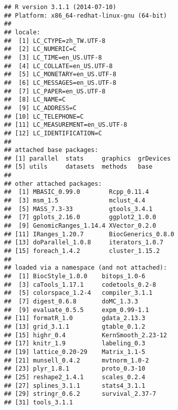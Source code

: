 \documentclass[a4paper,10pt]{article}\usepackage[]{graphicx}\usepackage[]{color}
\makeatletter
\newenvironment{kframe}{%
 \def\at@end@of@kframe{}%
 \ifinner\ifhmode%
  \def\at@end@of@kframe{\end{minipage}}%
  \begin{minipage}{\columnwidth}%
 \fi\fi%
 \def\FrameCommand##1{\hskip\@totalleftmargin \hskip-\fboxsep
 \colorbox{shadecolor}{##1}\hskip-\fboxsep
     \hskip-\linewidth \hskip-\@totalleftmargin \hskip\columnwidth}%
 \MakeFramed {\advance\hsize-\width
   \@totalleftmargin\z@ \linewidth\hsize
   \@setminipage}}%
 {\par\unskip\endMakeFramed%
 \at@end@of@kframe}
\newenvironment{knitrout}{}{} %
\makeatother
\begin{document}
\begin{knitrout}
\color{fgcolor}\begin{kframe}
\begin{verbatim}
## R version 3.1.1 (2014-07-10)
## Platform: x86_64-redhat-linux-gnu (64-bit)
## 
## locale:
##  [1] LC_CTYPE=zh_TW.UTF-8      
##  [2] LC_NUMERIC=C              
##  [3] LC_TIME=en_US.UTF-8       
##  [4] LC_COLLATE=en_US.UTF-8    
##  [5] LC_MONETARY=en_US.UTF-8   
##  [6] LC_MESSAGES=en_US.UTF-8   
##  [7] LC_PAPER=en_US.UTF-8      
##  [8] LC_NAME=C                 
##  [9] LC_ADDRESS=C              
## [10] LC_TELEPHONE=C            
## [11] LC_MEASUREMENT=en_US.UTF-8
## [12] LC_IDENTIFICATION=C       
## 
## attached base packages:
## [1] parallel  stats     graphics  grDevices
## [5] utils     datasets  methods   base     
## 
## other attached packages:
##  [1] MBASIC_0.99.0        Rcpp_0.11.4         
##  [3] msm_1.5              mclust_4.4          
##  [5] MASS_7.3-33          gtools_3.4.1        
##  [7] gplots_2.16.0        ggplot2_1.0.0       
##  [9] GenomicRanges_1.14.4 XVector_0.2.0       
## [11] IRanges_1.20.7       BiocGenerics_0.8.0  
## [13] doParallel_1.0.8     iterators_1.0.7     
## [15] foreach_1.4.2        cluster_1.15.2      
## 
## loaded via a namespace (and not attached):
##  [1] BiocStyle_1.0.0    bitops_1.0-6      
##  [3] caTools_1.17.1     codetools_0.2-8   
##  [5] colorspace_1.2-4   compiler_3.1.1    
##  [7] digest_0.6.8       doMC_1.3.3        
##  [9] evaluate_0.5.5     expm_0.99-1.1     
## [11] formatR_1.0        gdata_2.13.3      
## [13] grid_3.1.1         gtable_0.1.2      
## [15] highr_0.4          KernSmooth_2.23-12
## [17] knitr_1.9          labeling_0.3      
## [19] lattice_0.20-29    Matrix_1.1-5      
## [21] munsell_0.4.2      mvtnorm_1.0-2     
## [23] plyr_1.8.1         proto_0.3-10      
## [25] reshape2_1.4.1     scales_0.2.4      
## [27] splines_3.1.1      stats4_3.1.1      
## [29] stringr_0.6.2      survival_2.37-7   
## [31] tools_3.1.1
\end{verbatim}
\end{kframe}
\end{knitrout}






\end{document}
